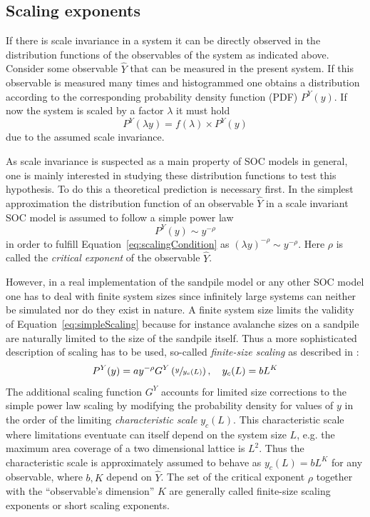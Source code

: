 \subsection{Scaling exponents}
\label{sec:th:scaling}
If there is scale invariance in a system it can be directly observed in the distribution functions
of the observables of the system as indicated above. Consider some observable $\hat{Y}$ that can be measured in the
present system. If this observable is measured many times and histogrammed one obtains a distribution according to the
corresponding probability density function (PDF) $P^{Y}(y)$.
If now the system is scaled by a factor $\lambda$ it must hold
\begin{equation}\label{eq:scalingCondition}
P^{Y}(\lambda y) = f(\lambda) \times P^{Y}(y)
\end{equation}
due to the assumed scale invariance.

As scale invariance is suspected as a main property of SOC models in general, one is mainly interested in studying
these distribution functions to test this hypothesis. To do this a theoretical prediction is necessary first.
In the simplest approximation the distribution function of an observable $\hat{Y}$ in a scale invariant SOC model
is assumed to follow a simple power law
\begin{equation}\label{eq:simpleScaling}
P^{Y}(y) \sim y^{-\rho}
\end{equation}
in order to fulfill Equation~\eqref{eq:scalingCondition} as $(\lambda y)^{-\rho}\sim y^{-\rho}$.
Here $\rho$ is called the \emph{critical exponent} of the observable $\hat{Y}$.

However, in a real implementation of the sandpile model or any other SOC model one has to deal with finite system sizes
since infinitely large systems can neither be simulated nor do they exist in nature.
A finite system size limits the validity of Equation~\eqref{eq:simpleScaling} because for instance avalanche sizes on a
sandpile are naturally limited to the size of the sandpile itself. Thus a more sophisticated description of scaling
has to be used, so-called \emph{finite-size scaling} as described in \cite{SOC-book}:
\begin{equation}\label{eq:finiteSizeScaling}
P^{Y}(y) = a y^{-\rho} G^{Y}\left(\sfrac{y}{y_c(L)}\right), \quad y_c(L)=b L^K
\end{equation}
The additional scaling function $G^{Y}$ accounts for limited size corrections to the simple power law scaling
by modifying the probability density for values of $y$ in the order of the limiting \emph{characteristic scale}
$y_c(L)$. This characteristic scale where limitations eventuate can itself depend on the system size $L$,
e.g. the maximum area coverage of a two dimensional lattice is $L^2$. Thus the characteristic scale is approximately
assumed to behave as $y_c(L)=b L^K$ for any observable, where $b,K$ depend on $\hat{Y}$.
The set of the critical exponent $\rho$ together with the \enquote{observable's dimension} $K$ are
generally called finite-size scaling exponents or short scaling exponents.

